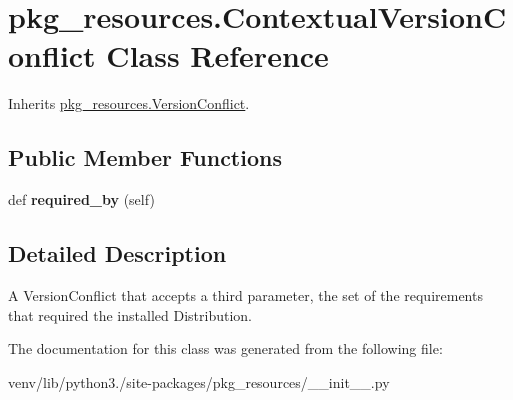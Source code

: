 \hypertarget{classpkg__resources_1_1_contextual_version_conflict}{}\section{pkg\+\_\+resources.\+Contextual\+Version\+Conflict Class Reference}
\label{classpkg__resources_1_1_contextual_version_conflict}


Inherits \hyperlink{classpkg__resources_1_1_version_conflict}{pkg\+\_\+resources.\+Version\+Conflict}.

\subsection*{Public Member Functions}
\begin{DoxyCompactItemize}
\item 
\mbox{\label{classpkg__resources_1_1_contextual_version_conflict_a429c1a4ab6cb79d7fedc5e9200b15b53}} 
def {\bfseries required\+\_\+by} (self)
\end{DoxyCompactItemize}


\subsection{Detailed Description}
\begin{DoxyVerb}A VersionConflict that accepts a third parameter, the set of the
requirements that required the installed Distribution.
\end{DoxyVerb}
 

The documentation for this class was generated from the following file\+:\begin{DoxyCompactItemize}
\item 
venv/lib/python3./site-\/packages/pkg\+\_\+resources/\+\_\+\+\_\+init\+\_\+\+\_\+.\+py\end{DoxyCompactItemize}
